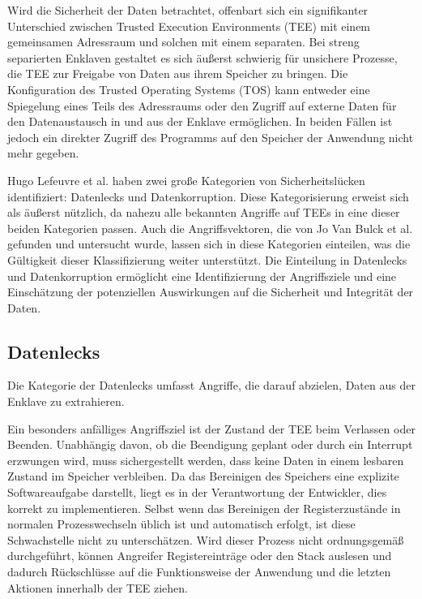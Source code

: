 Wird die Sicherheit der Daten betrachtet, offenbart sich ein signifikanter Unterschied zwischen Trusted Execution Environments (TEE) mit einem gemeinsamen Adressraum und solchen mit einem separaten. 
Bei streng separierten Enklaven gestaltet es sich äußerst schwierig für unsichere Prozesse, die TEE zur Freigabe von Daten aus ihrem Speicher zu bringen.
Die Konfiguration des Trusted Operating Systems (TOS) kann entweder eine Spiegelung eines Teils des Adressraums oder den Zugriff auf externe Daten für den Datenaustausch in und aus der Enklave ermöglichen. 
In beiden Fällen ist jedoch ein direkter Zugriff des Programms auf den Speicher der Anwendung nicht mehr gegeben.

Hugo Lefeuvre et al.\cite{CIVPaper} haben zwei große Kategorien von Sicherheitslücken identifiziert: Datenlecks und Datenkorruption. Diese Kategorisierung erweist sich als äußerst nützlich, da nahezu alle bekannten Angriffe auf TEEs in eine dieser beiden Kategorien passen. Auch die Angriffsvektoren, die von Jo Van Bulck et al.\cite{TEEPaper} gefunden und untersucht wurde, lassen sich in diese Kategorien einteilen, was die Gültigkeit dieser Klassifizierung weiter unterstützt. Die Einteilung in Datenlecks und Datenkorruption ermöglicht eine Identifizierung der Angriffsziele und eine Einschätzung der potenziellen Auswirkungen auf die Sicherheit und Integrität der Daten.

\subsection{Datenlecks}
Die Kategorie der Datenlecks umfasst Angriffe, die darauf abzielen, Daten aus der Enklave zu extrahieren. 

Ein besonders anfälliges Angriffsziel ist der Zustand der TEE beim Verlassen oder Beenden. Unabhängig davon, ob die Beendigung geplant oder durch ein Interrupt erzwungen wird, muss sichergestellt werden, dass keine Daten in einem lesbaren Zustand im Speicher verbleiben. Da das Bereinigen des Speichers eine explizite Softwareaufgabe darstellt, liegt es in der Verantwortung der Entwickler, dies korrekt zu implementieren. Selbst wenn das Bereinigen der Registerzustände in normalen Prozesswechseln üblich ist und automatisch erfolgt, ist diese Schwachstelle nicht zu unterschätzen. Wird dieser Prozess nicht ordnungsgemäß durchgeführt, können Angreifer Registereinträge oder den Stack auslesen und dadurch Rückschlüsse auf die Funktionsweise der Anwendung und die letzten Aktionen innerhalb der TEE ziehen.

